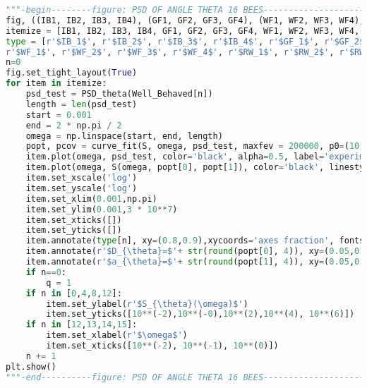 \begin{lstlisting}[language=Python, basicstyle=\tiny, frame=single, keywordstyle=\color{teal}, commentstyle=\color{olive}, stringstyle=\color{red}]
"""-begin--------figure: PSD OF ANGLE THETA 16 BEES--------------------------"""
fig, ((IB1, IB2, IB3, IB4), (GF1, GF2, GF3, GF4), (WF1, WF2, WF3, WF4), (RW1, RW2, RW3, RW4)) = plt.subplots(4, 4, figsize=(10,10))
itemize = [IB1, IB2, IB3, IB4, GF1, GF2, GF3, GF4, WF1, WF2, WF3, WF4, RW1, RW2, RW3, RW4]
type = [r'$IB_1$', r'$IB_2$', r'$IB_3$', r'$IB_4$', r'$GF_1$', r'$GF_2$', r'$GF_3$', r'$GF_4$', 
r'$WF_1$', r'$WF_2$', r'$WF_3$', r'$WF_4$', r'$RW_1$', r'$RW_2$', r'$RW_3$', r'$RW_4$']
n=0
fig.set_tight_layout(True)
for item in itemize:
    psd_test = PSD_theta(Well_Behaved[n])
    length = len(psd_test)
    start = 0.001
    end = 2 * np.pi / 2
    omega = np.linspace(start, end, length)
    popt, pcov = curve_fit(S, omega, psd_test, maxfev = 200000, p0=(10,0.001))#, bounds=([0, 0], [10000, 10]))
    item.plot(omega, psd_test, color='black', alpha=0.5, label='experiment')
    item.plot(omega, S(omega, popt[0], popt[1]), color='black', linestyle='dotted', label='model fit')
    item.set_xscale('log')
    item.set_yscale('log')
    item.set_xlim(0.001,np.pi)
    item.set_ylim(0.001,3 * 10**7)
    item.set_xticks([])
    item.set_yticks([])
    item.annotate(type[n], xy=(0.8,0.9),xycoords='axes fraction', fontsize=12)
    item.annotate(r'$D_{\theta}=$'+ str(round(popt[0], 4)), xy=(0.05,0.11),xycoords='axes fraction', fontsize=10)
    item.annotate(r'$a_{\theta}=$'+ str(round(popt[1], 4)), xy=(0.05,0.05),xycoords='axes fraction', fontsize=10)
    if n==0:
        q = 1
    if n in [0,4,8,12]:
        item.set_ylabel(r'$S_{\theta}(\omega)$')
        item.set_yticks([10**(-2),10**(-0),10**(2),10**(4), 10**(6)])
    if n in [12,13,14,15]:
        item.set_xlabel(r'$\omega$')
        item.set_xticks([10**(-2), 10**(-1), 10**(0)])
    n += 1
plt.show()
"""-end----------figure: PSD OF ANGLE THETA 16 BEES--------------------------"""


\end{lstlisting}
